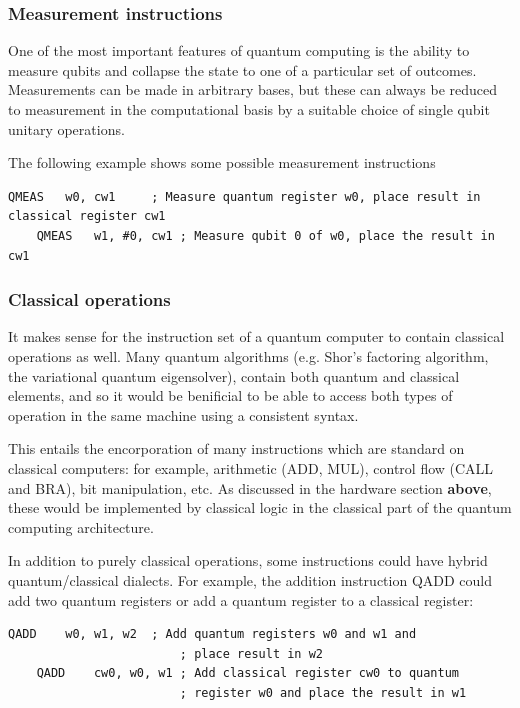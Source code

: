 \subsubsection{Measurement instructions}

One of the most important features of quantum computing is the ability to measure qubits and collapse the state to one of a particular set of outcomes. Measurements can be made in arbitrary bases, but these can always be reduced to measurement in the computational basis by a suitable choice of single qubit unitary operations. 

The following example shows some possible measurement instructions
\begin{lstlisting}[language=Asm,caption={Quantum register measurement}]
    QMEAS   w0, cw1     ; Measure quantum register w0, place result in classical register cw1
    QMEAS   w1, #0, cw1 ; Measure qubit 0 of w0, place the result in cw1
\end{lstlisting}

\subsubsection{Classical operations}

It makes sense for the instruction set of a quantum computer to contain classical operations as well. Many quantum algorithms (e.g. Shor's factoring algorithm, the variational quantum eigensolver), contain both quantum and classical elements, and so it would be benificial to be able to access both types of operation in the same machine using a consistent syntax. 

This entails the encorporation of many instructions which are standard on classical computers: for example, arithmetic (ADD, MUL), control flow (CALL and BRA), bit manipulation, etc. As discussed in the hardware section \textbf{above}, these would be implemented by classical logic in the classical part of the quantum computing architecture. 

In addition to purely classical operations, some instructions could have hybrid quantum/classical dialects. For example, the addition instruction QADD could add two quantum registers or add a quantum register to a classical register:
\begin{lstlisting}[language=Asm,caption={Different dialects of QADD}]
    QADD    w0, w1, w2  ; Add quantum registers w0 and w1 and 
                        ; place result in w2
    QADD    cw0, w0, w1 ; Add classical register cw0 to quantum                      
                        ; register w0 and place the result in w1

\end{lstlisting}

